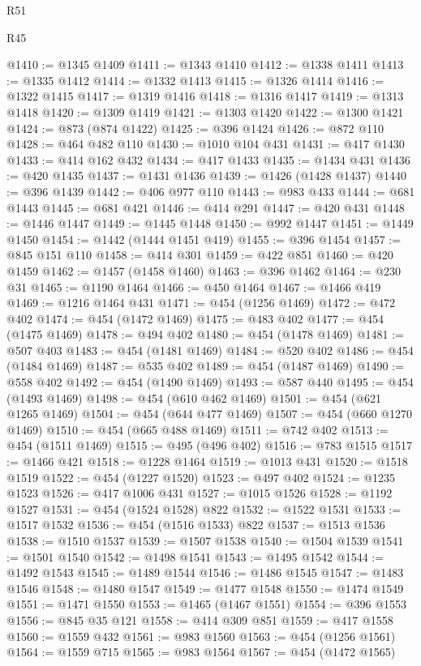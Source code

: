 \begin{lexlean}{R51}
\begin{lexlean}{R45}
\begin{coremodule}
{{{{{{{{{{{{{{{{{{{{{{{{{{{{{{{{{{{{{{{{{{{{{{{{{{{{{{{{{{{{{{{{{{{{{{{{{{{{{{{{{{{{{{{{{{{@1410 := @1345 @1409
@1411 := @1343 @1410
@1412 := @1338 @1411
@1413 := @1335 @1412
@1414 := @1332 @1413
@1415 := @1326 @1414
@1416 := @1322 @1415
@1417 := @1319 @1416
@1418 := @1316 @1417
@1419 := @1313 @1418
@1420 := @1309 @1419
@1421 := @1303 @1420
@1422 := @1300 @1421
@1424 := @873 (@874 @1422)
@1425 := @396 @1424
@1426 := @872 @110
@1428 := @464 @482 @110
@1430 := @1010 @104 @431
@1431 := @417 @1430
@1433 := @414 @162 @432
@1434 := @417 @1433
@1435 := @1434 @431
@1436 := @420 @1435
@1437 := @1431 @1436
@1439 := @1426 (@1428 @1437)
@1440 := @396 @1439
@1442 := @406 @977 @110
@1443 := @983 @433
@1444 := @681 @1443
@1445 := @681 @421
@1446 := @414 @291
@1447 := @420 @431
@1448 := @1446 @1447
@1449 := @1445 @1448
@1450 := @992 @1447
@1451 := @1449 @1450
@1454 := @1442 (@1444 @1451 @419)
@1455 := @396 @1454
@1457 := @845 @151 @110
@1458 := @414 @301
@1459 := @422 @851
@1460 := @420 @1459
@1462 := @1457 (@1458 @1460)
@1463 := @396 @1462
@1464 := @230 @31
@1465 := @1190 @1464
@1466 := @450 @1464
@1467 := @1466 @419
@1469 := @1216 @1464 @431
@1471 := @454 (@1256 @1469)
@1472 := @472 @402
@1474 := @454 (@1472 @1469)
@1475 := @483 @402
@1477 := @454 (@1475 @1469)
@1478 := @494 @402
@1480 := @454 (@1478 @1469)
@1481 := @507 @403
@1483 := @454 (@1481 @1469)
@1484 := @520 @402
@1486 := @454 (@1484 @1469)
@1487 := @535 @402
@1489 := @454 (@1487 @1469)
@1490 := @558 @402
@1492 := @454 (@1490 @1469)
@1493 := @587 @440
@1495 := @454 (@1493 @1469)
@1498 := @454 (@610 @462 @1469)
@1501 := @454 (@621 @1265 @1469)
@1504 := @454 (@644 @477 @1469)
@1507 := @454 (@660 @1270 @1469)
@1510 := @454 (@665 @488 @1469)
@1511 := @742 @402
@1513 := @454 (@1511 @1469)
@1515 := @495 (@496 @402)
@1516 := @783 @1515
@1517 := @1466 @421
@1518 := @1228 @1464
@1519 := @1013 @431
@1520 := @1518 @1519
@1522 := @454 (@1227 @1520)
@1523 := @497 @402
@1524 := @1235 @1523
@1526 := @417 @1006 @431
@1527 := @1015 @1526
@1528 := @1192 @1527
@1531 := @454 (@1524 @1528) @822
@1532 := @1522 @1531
@1533 := @1517 @1532
@1536 := @454 (@1516 @1533) @822
@1537 := @1513 @1536
@1538 := @1510 @1537
@1539 := @1507 @1538
@1540 := @1504 @1539
@1541 := @1501 @1540
@1542 := @1498 @1541
@1543 := @1495 @1542
@1544 := @1492 @1543
@1545 := @1489 @1544
@1546 := @1486 @1545
@1547 := @1483 @1546
@1548 := @1480 @1547
@1549 := @1477 @1548
@1550 := @1474 @1549
@1551 := @1471 @1550
@1553 := @1465 (@1467 @1551)
@1554 := @396 @1553
@1556 := @845 @35 @121
@1558 := @414 @309 @851
@1559 := @417 @1558
@1560 := @1559 @432
@1561 := @983 @1560
@1563 := @454 (@1256 @1561)
@1564 := @1559 @715
@1565 := @983 @1564
@1567 := @454 (@1472 @1565)
}}}}}}}}}}}}}}}}}}}}}}}}}}}}}}}}}}}}}}}}}}}}}}}}}}}}}}}}}}}}}}}}}}}}}}}}}}}}}}}}}}}}}}}}}}}
\end{coremodule}
\end{lexlean}
\end{lexlean}
